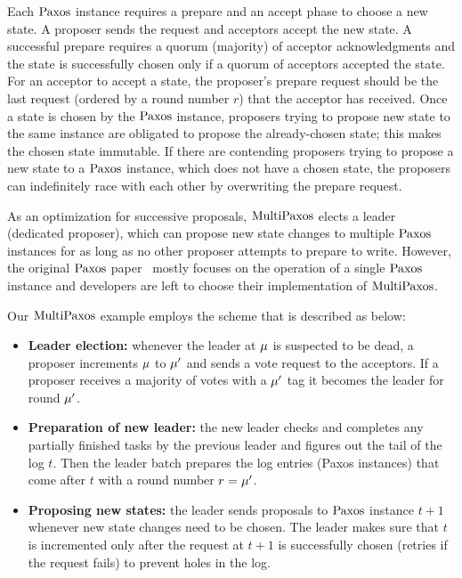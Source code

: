 Each $\mathrm{Paxos}$ instance requires a prepare and an accept phase to choose a new
state. A proposer sends the request and acceptors accept the new state.
A successful prepare requires a quorum (majority) of acceptor acknowledgments
and the state is successfully chosen only if a quorum of acceptors
accepted the state. For an acceptor to accept a state, the proposer's prepare
request should be the last request (ordered by a round number $r$)
that the acceptor has received. Once a state is chosen by the $\mathrm{Paxos}$ instance,
proposers trying to propose new state to the same instance are obligated to
propose the already-chosen state; this makes the chosen state immutable.
If there are contending proposers trying to propose a new
state to a $\mathrm{Paxos}$ instance, which does not have a chosen state, the proposers
can indefinitely race with each other by overwriting the prepare request.

As an optimization for successive proposals, $\mathrm{MultiPaxos}$ elects a
leader (dedicated proposer), which can propose new state changes to multiple $\mathrm{Paxos}$
instances for as long as no other proposer attempts to prepare to write. However, the
original $\mathrm{Paxos}$ paper~\cite{paxos, paxosmadesimple} mostly focuses on the operation
of a single $\mathrm{Paxos}$ instance
and developers are left to choose their implementation of $\mathrm{MultiPaxos}$.

Our $\mathrm{MultiPaxos}$ example employs the scheme that is described as below:
\begin{itemize}[leftmargin=*]
	\item {\textbf{Leader election: }} whenever the leader at $\mu$ is
		suspected to be dead, a proposer increments $\mu$ to $\mu'$ and
		sends a vote request to the acceptors.
		If a proposer receives a majority of votes with a $\mu'$ tag it
		becomes the leader for round $\mu'$.
	\item {\textbf{Preparation of new leader: }} the new leader checks and completes any
		partially finished tasks by the previous leader and figures out the
		tail of the log $t$. Then the leader batch prepares the log entries
		(Paxos instances) that come after $t$ with a round number $r = \mu'$.
	\item {\textbf{Proposing new states: }} the leader sends proposals
		to $\mathrm{Paxos}$ instance $t+1$ whenever new state changes need to be chosen.
		The leader makes sure that $t$ is incremented only after the
		request at $t+1$ is successfully chosen (retries if the
		request fails) to prevent holes in the log.
\end{itemize}


